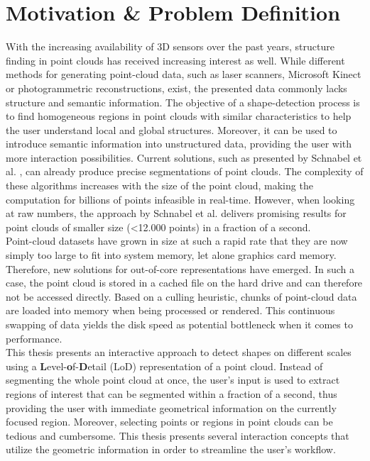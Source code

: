 \section{Motivation \& Problem Definition}

With the increasing availability of 3D sensors over the past years, structure finding in point clouds has received increasing interest as well. While different methods for generating point-cloud data, such as laser scanners, Microsoft Kinect or photogrammetric reconstructions, exist, the presented data commonly lacks structure and semantic information. The objective of a shape-detection process is to find homogeneous regions in point clouds with similar characteristics to help the user understand local and global structures. Moreover, it can be used to introduce semantic information into unstructured data, providing the user with more interaction possibilities. Current solutions, such as presented by Schnabel et al. \cite{schnabel-2007-efficient}\cite{schnabel-2007-ransac}, can already produce precise segmentations of point clouds. The complexity of these algorithms increases with the size of the point cloud, making the computation for billions of points infeasible in real-time. However, when looking at raw numbers, the approach by Schnabel et al. \cite{schnabel-2007-ransac} delivers promising results for point clouds of smaller size (\textless 12.000 points) in a fraction of a second. 
\\
Point-cloud datasets have grown in size at such a rapid rate that they are now simply too large to fit into system memory, let alone graphics card memory. Therefore, new solutions for out-of-core representations have emerged. In such a case, the point cloud is stored in a cached file on the hard drive and can therefore not be accessed directly. Based on a culling heuristic, chunks of point-cloud data are loaded into memory when being processed or rendered. This continuous swapping of data yields the disk speed as potential bottleneck when it comes to performance.
\\
This thesis presents an interactive approach to detect shapes on different scales using a \textbf{L}evel-\textbf{o}f-\textbf{D}etail (LoD) representation of a point cloud. Instead of segmenting the whole point cloud at once, the user's input is used to extract regions of interest that can be segmented within a fraction of a second, thus providing the user with immediate geometrical information on the currently focused region. Moreover, selecting points or regions in point clouds can be tedious and cumbersome. This thesis presents several interaction concepts that utilize the geometric information in order to streamline the user's workflow. 